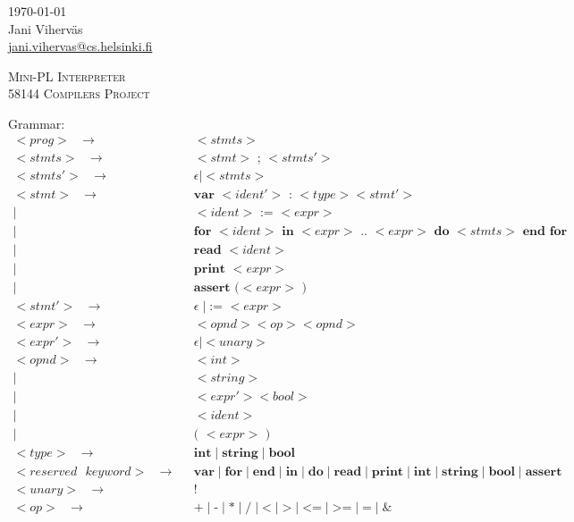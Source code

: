 \documentclass[a4paper,12pt]{article}
\author{Jani Viherväs}
\newcommand{\bb}[1]{\textbf{#1}}
\newcommand{\ttt}[1]{\texttt{#1}}
\newcommand{\e}{\epsilon}
\newcommand{\s}{\ttt{ }}
\begin{document}
\begin{flushright}
\today \\
\vspace{1em}
Jani Viherväs\\ 
\href{mailto:jani.vihervas@cs.helsinki.fi}{jani.vihervas@cs.helsinki.fi}
\end{flushright}

\vfill

\begin{center}
\textsc{\LARGE Mini-PL Interpreter} \\
\vspace{1em}
\textsc{\large 58144 Compilers Project}
\end{center}

\vfill

Grammar:
\begin{align*}
<prog>\s \to \s &<stmts> \\
<stmts>\s \to \s &<stmt> \bb{ ; } <stmts'> \\
<stmts'>\s \to \s &\e \mid <stmts> \\
<stmt>\s \to \s &\bb{var } <ident'> \bb{ : } <type> <stmt'> \\ 
       \mid \s &<ident> \bb{ := } <expr> \\  
       \mid \s &\bb{for } <ident> \bb{ in } <expr> \bb{ .. } <expr> \bb{ do } 
             <stmts> \bb{ end } \bb{for} \\
       \mid \s &\bb{read } <ident> \\
       \mid \s &\bb{print } <expr> \\
       \mid \s &\bb{assert (}  <expr> \bb{ )} \\
<stmt'>\s \to \s &\e \mid \bb{:= } <expr> \\
<expr>\s \to \s &<opnd> <op> <opnd> \\
<expr'>\s \to \s &\e \mid <unary> \\
<opnd>\s \to \s &<int> \\
       \mid \s &<string> \\
       \mid \s &<expr'><bool> \\
       \mid \s &<ident> \\
       \mid \s &\bb{( } <expr> \bb{ )} \\
<type>\s \to \s &\bb{int} \mid \bb{string} \mid \bb{bool} \\
<reserved\s keyword>\s \to \s 
              &\bb{var} \mid \bb{for} \mid \bb{end} \mid \bb{in} \mid \bb{do}
              \mid \bb{read} \mid \bb{print} \mid \bb{int} \mid \bb{string} \mid \bb{bool} \mid
              \bb{assert} \\
<unary>\s \to \s &\bb{!} \\
<op>\s \to \s &\bb{+} \mid \bb{-} \mid \bb{*} \mid \bb{/} \mid \bb{<} \mid
\bb{>} \mid \bb{<=} \mid \bb{>=} \mid \bb{=} \mid \bb{\&}
\end{align*}
\end{document}
